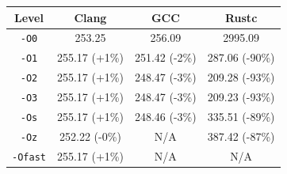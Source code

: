 \begin{tabular*}{\columnwidth}{@{\extracolsep\fill}cccc@{\extracolsep\fill}}
\toprule
\textbf{Level} & \textbf{Clang} & \textbf{GCC} & \textbf{Rustc} \\
\midrule
\texttt{-O0} & 253.25 & 256.09 & 2995.09 \\
\texttt{-O1} & 255.17 (+1\%) & 251.42 (-2\%) & 287.06 (-90\%) \\
\texttt{-O2} & 255.17 (+1\%) & 248.47 (-3\%) & 209.28 (-93\%) \\
\texttt{-O3} & 255.17 (+1\%) & 248.47 (-3\%) & 209.23 (-93\%) \\
\texttt{-Os} & 255.17 (+1\%) & 248.46 (-3\%) & 335.51 (-89\%) \\
\texttt{-Oz} & 252.22 (-0\%) & N/A & 387.42 (-87\%) \\
\texttt{-Ofast} & 255.17 (+1\%) & N/A & N/A \\
\bottomrule
\end{tabular*}
